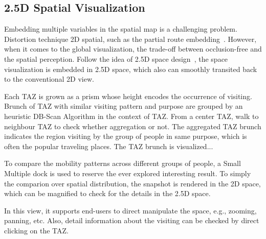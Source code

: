 \subsection{2.5D Spatial Visualization}

Embedding multiple variables in the spatial map is a challenging problem. Distortion technique 2D spatial, such as the partial route embedding~\cite{sun2016embedding}. However, when it comes to the global visualization, the trade-off between occlusion-free and the spatial perception. Follow the idea of 2.5D space design~\cite{Tominski2012_stacking}, the space visualization is embedded in 2.5D space, which also can smoothly transited back to the conventional 2D view.  

 Each TAZ is grown as a prism whose height encodes the occurrence of visiting. Brunch of TAZ with similar visiting pattern and purpose are grouped by an heuristic DB-Scan Algorithm in the context of TAZ. From a center TAZ, walk to neighbour TAZ to check whether aggregation or not. The aggregated TAZ brunch indicates the region visiting by the group of people in same purpose, which is often the popular traveling places. The TAZ brunch is visualized...

 To compare the mobility patterns across different groups of people, a Small Multiple dock is used to reserve the ever explored interesting result. To simply the comparion over spatial distribution, the snapshot is rendered in the 2D space, which can be magnified to check for the details in the 2.5D space.

 In this view, it supports end-users to direct manipulate the space, e.g., zooming, panning, etc. Also, detail information about the visiting can be checked by direct clicking on the TAZ. 